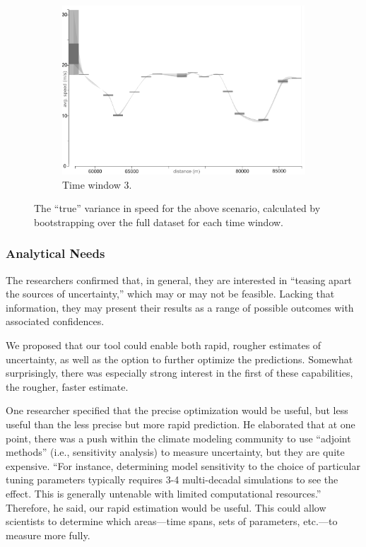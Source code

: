 \begin{figure}[h]
\begin{subfigure}{0.32\textwidth}
        \includegraphics[width=\textwidth]{images/sampling/timestep_c_ground_truth.png}
        \caption{Time window 3.}
        \label{fig:f}
    \end{subfigure}
     \caption{The ``true'' variance in speed for the above scenario, calculated by bootstrapping over the full dataset for each time window.}
     \label{traffic}
\end{figure}

\subsubsection{Analytical Needs}
The researchers confirmed that, in general, they are interested in ``teasing apart the sources of uncertainty,'' which may or may not be feasible. Lacking that information, they may present their results as a range of possible outcomes with associated confidences.

We proposed that our tool could enable both rapid, rougher estimates of uncertainty, as well as the option to further optimize the predictions. Somewhat surprisingly, there was especially strong interest in the first of these capabilities, the rougher, faster estimate.

One researcher specified that the precise optimization would be useful, but less useful than the less precise but more rapid prediction. He elaborated that at one point, there was a push within the climate modeling community to use ``adjoint methods'' (i.e., sensitivity analysis) to measure uncertainty, but they are quite expensive. “For instance, determining model sensitivity to the choice of particular tuning parameters typically requires 3-4 multi-decadal simulations to see the effect. This is generally untenable with limited computational resources.” Therefore, he said, our rapid estimation would be useful. This could allow scientists to determine which areas---time spans, sets of parameters, etc.---to measure more fully.

